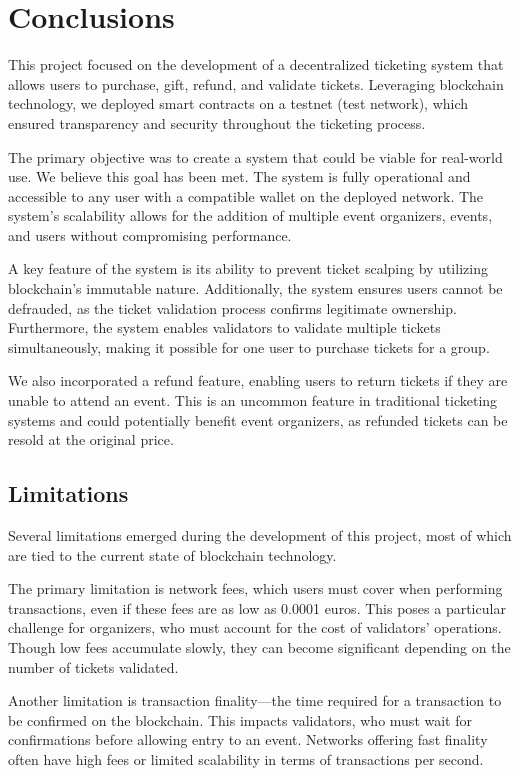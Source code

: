 \chapter{Conclusions}
\label{ch:conclusions}

This project focused on the development of a decentralized ticketing system
that allows users to purchase, gift, refund, and validate tickets. Leveraging
blockchain technology, we deployed smart contracts on a testnet (test network),
which ensured transparency and security throughout the ticketing process.

The primary objective was to create a system that could be viable for
real-world use. We believe this goal has been met. The system is fully
operational and accessible to any user with a compatible wallet on the deployed
network. The system's scalability allows for the addition of multiple event
organizers, events, and users without compromising performance.

A key feature of the system is its ability to prevent ticket scalping by
utilizing blockchain's immutable nature. Additionally, the system ensures users
cannot be defrauded, as the ticket validation process confirms legitimate
ownership. Furthermore, the system enables validators to validate multiple
tickets simultaneously, making it possible for one user to purchase tickets for
a group.

We also incorporated a refund feature, enabling users to return tickets if they
are unable to attend an event. This is an uncommon feature in traditional
ticketing systems and could potentially benefit event organizers, as refunded
tickets can be resold at the original price.

\section{Limitations}
\label{sec:limitations}

Several limitations emerged during the development of this project, most of
which are tied to the current state of blockchain technology.

The primary limitation is network fees, which users must cover when performing
transactions, even if these fees are as low as 0.0001 euros. This poses a
particular challenge for organizers, who must account for the cost of
validators' operations. Though low fees accumulate slowly, they can become
significant depending on the number of tickets validated.

Another limitation is transaction finality—the time required for a transaction
to be confirmed on the blockchain. This impacts validators, who must wait for
confirmations before allowing entry to an event. Networks offering fast
finality often have high fees or limited scalability in terms of transactions
per second.

